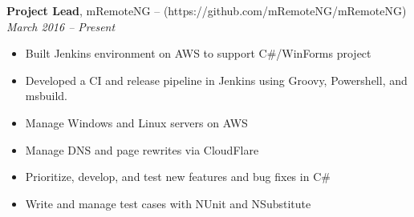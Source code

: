 {\bf Project Lead}, mRemoteNG – (https://github.com/mRemoteNG/mRemoteNG)\\
{\it March 2016 – Present}
\begin{itemize}
	\item Built Jenkins environment on AWS to support C\#/WinForms project
	\item Developed a CI and release pipeline in Jenkins using Groovy, Powershell, and msbuild.
	\item Manage Windows and Linux servers on AWS
	\item Manage DNS and page rewrites via CloudFlare
	\item Prioritize, develop, and test new features and bug fixes in C\#
	\item Write and manage test cases with NUnit and NSubstitute
\end{itemize}